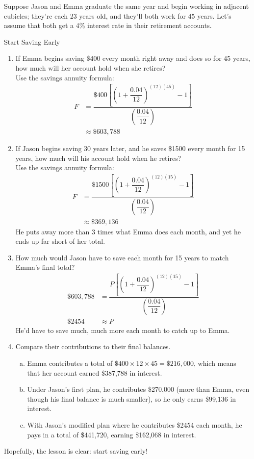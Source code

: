 Suppose Jason and Emma graduate the same year and begin working in adjacent cubicles; they're each 23 years old, and they'll both work for 45 years.  Let's assume that both get a 4\% interest rate in their retirement accounts. 

\begin{example}[https://www.youtube.com/watch?v=9hcZL9uCEoY]{Start Saving Early}
\begin{enumerate}[(1)]
\item If Emma begins saving \$400 every month right away and does so for 45 years, how much will her account hold when she retires?\\

Use the savings annuity formula:
\begin{align*}
F &= \dfrac{\$400\left[\left(1+\dfrac{0.04}{12}\right)^{(12)(45)}-1\right]}{\left(\dfrac{0.04}{12}\right)}\\
&\approx \$603,788
\end{align*}

\item If Jason begins saving 30 years later, and he saves \$1500 every month for 15 years, how much will his account hold when he retires?\\

Use the savings annuity formula:
\begin{align*}
F &= \dfrac{\$1500\left[\left(1+\dfrac{0.04}{12}\right)^{(12)(15)}-1\right]}{\left(\dfrac{0.04}{12}\right)}\\
&\approx \$369,136
\end{align*}
He puts away more than 3 times what Emma does each month, and yet he ends up far short of her total.

\item How much would Jason have to save each month for 15 years to match Emma's final total?\\

\begin{align*}
\$603,788 &= \dfrac{P\left[\left(1+\dfrac{0.04}{12}\right)^{(12)(15)}-1\right]}{\left(\dfrac{0.04}{12}\right)}\\
\$2454 &\approx P
\end{align*}
He'd have to save much, much more each month to catch up to Emma.

\item Compare their contributions to their final balances.
\begin{enumerate}[(a)]
\item Emma contributes a total of $\$400 \times 12 \times 45 = \$216,000$, which means that her account earned \$387,788 in interest.
\item Under Jason's first plan, he contributes \$270,000 (more than Emma, even though his final balance is much smaller), so he only earns \$99,136 in interest.
\item With Jason's modified plan where he contributes \$2454 each month, he pays in a total of \$441,720, earning \$162,068 in interest.
\end{enumerate}
\end{enumerate} 
Hopefully, the lesson is clear: start saving early!
\end{example}
\pagebreak

